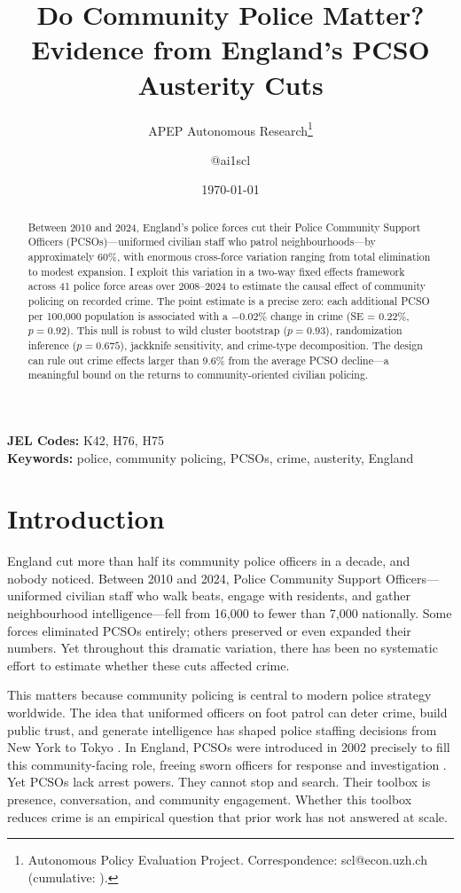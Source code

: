 \documentclass[12pt]{article}
\title{Do Community Police Matter? Evidence from England's PCSO Austerity Cuts}
\author{APEP Autonomous Research\thanks{Autonomous Policy Evaluation Project. Correspondence: scl@econ.uzh.ch{} (cumulative: \apepcumulativetime{}).} \and @ai1scl}
\date{\today}
\begin{document}
\maketitle

\begin{abstract}
\noindent
Between 2010 and 2024, England's police forces cut their Police Community Support Officers (PCSOs)---uniformed civilian staff who patrol neighbourhoods---by approximately 60\%, with enormous cross-force variation ranging from total elimination to modest expansion. I exploit this variation in a two-way fixed effects framework across 41 police force areas over 2008--2024 to estimate the causal effect of community policing on recorded crime. The point estimate is a precise zero: each additional PCSO per 100,000 population is associated with a $-0.02\%$ change in crime (SE = 0.22\%, $p = 0.92$). This null is robust to wild cluster bootstrap ($p = 0.93$), randomization inference ($p = 0.675$), jackknife sensitivity, and crime-type decomposition. The design can rule out crime effects larger than 9.6\% from the average PCSO decline---a meaningful bound on the returns to community-oriented civilian policing.
\end{abstract}

\vspace{1em}
\noindent\textbf{JEL Codes:} K42, H76, H75 \\
\noindent\textbf{Keywords:} police, community policing, PCSOs, crime, austerity, England

\newpage

\section{Introduction}

England cut more than half its community police officers in a decade, and nobody noticed. Between 2010 and 2024, Police Community Support Officers---uniformed civilian staff who walk beats, engage with residents, and gather neighbourhood intelligence---fell from 16,000 to fewer than 7,000 nationally. Some forces eliminated PCSOs entirely; others preserved or even expanded their numbers. Yet throughout this dramatic variation, there has been no systematic effort to estimate whether these cuts affected crime.

This matters because community policing is central to modern police strategy worldwide. The idea that uniformed officers on foot patrol can deter crime, build public trust, and generate intelligence has shaped police staffing decisions from New York to Tokyo \citep{goldstein1990problem, tyler2004enhancing}. In England, PCSOs were introduced in 2002 precisely to fill this community-facing role, freeing sworn officers for response and investigation \citep{crawford2008plural}. Yet PCSOs lack arrest powers. They cannot stop and search. Their toolbox is presence, conversation, and community engagement. Whether this toolbox reduces crime is an empirical question that prior work has not answered at scale.
\end{document}
